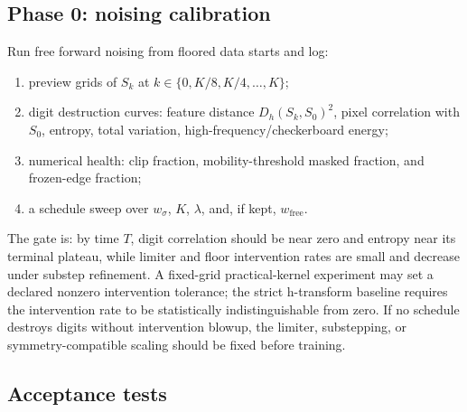 \documentclass[11pt]{article}
\numberwithin{equation}{section}
\newcommand{\1}{\mathbf 1}
\begin{document}
\subsection{Phase 0: noising calibration}

Run free forward noising from floored data starts and log:
\begin{enumerate}[label=\textup{(P0.\arabic*)},leftmargin=2.9em]
  \item preview grids of \(S_k\) at \(k\in\{0,K/8,K/4,\ldots,K\}\);
  \item digit destruction curves: feature distance \(D_h(S_k,S_0)^2\), pixel correlation with \(S_0\), entropy, total variation, high-frequency/checkerboard energy;
  \item numerical health: clip fraction, mobility-threshold masked fraction, and frozen-edge fraction;
  \item a schedule sweep over \(w_\sigma\), \(K\), \(\lambda\), and, if kept, \(w_{\mathrm{free}}\).
\end{enumerate}
The gate is: by time \(T\), digit correlation should be near zero and entropy near its terminal plateau, while limiter and floor intervention rates are small and decrease under substep refinement.  A fixed-grid practical-kernel experiment may set a declared nonzero intervention tolerance; the strict h-transform baseline requires the intervention rate to be statistically indistinguishable from zero.  If no schedule destroys digits without intervention blowup, the limiter, substepping, or symmetry-compatible scaling should be fixed before training.

\subsection{Acceptance tests}
\end{document}
